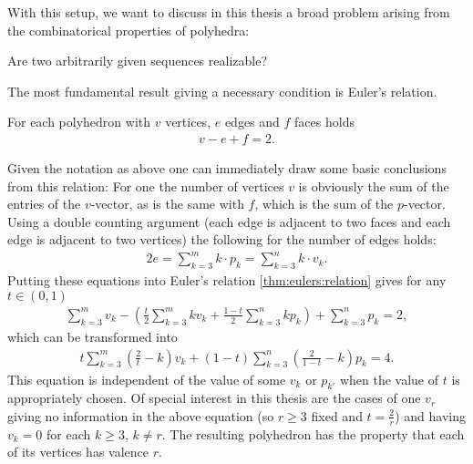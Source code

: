 With this setup, we want to discuss in this thesis a broad problem arising from the combinatorical properties of polyhedra:
\begin{problem} Are two arbitrarily given sequences realizable?
\end{problem}
The most fundamental result giving a necessary condition is Euler's relation.
\begin{theorem}\label{thm:eulers:relation}
  For each polyhedron with $v$ vertices, $e$ edges and $f$ faces holds
  \begin{align*}
    v - e + f = 2.
  \end{align*}
\end{theorem}
Given the notation as above one can immediately draw some basic conclusions from this relation: For one the number of vertices $v$ is obviously the sum of the entries of the $v$-vector, as is the same with $f$, which is the sum of the $p$-vector. Using a double counting argument (each edge is adjacent to two faces and each edge is adjacent to two vertices) the following for the number of edges holds:
\begin{align*}
  2e = \sum_{k=3}^{m} k \cdot p_k = \sum_{k=3}^{n} k \cdot v_k.
\end{align*}
Putting these equations into Euler's relation \autoref{thm:eulers:relation} gives for any $t \in (0, 1)$
\begin{align*}
  \sum_{k=3}^m v_k - \left(\frac{t}{2} \sum_{k=3}^m k v_k + \frac{1-t}{2} \sum_{k=3}^n k p_k \right) + \sum_{k=3}^n p_k = 2,
\end{align*}
which can be transformed into
\begin{align}
  t \sum_{k=3}^m \left(\frac{2}{t} - k \right) v_k + (1-t) \sum_{k=3}^n \left( \frac{2}{1-t} - k \right) p_k = 4. \label{eq:general:vp:relation}
\end{align}
This equation is independent of the value of some $v_k$ or $p_{k'}$ when the value of $t$ is appropriately chosen. Of special interest in this thesis are the cases of one $v_r$ giving no information in the above equation (so $r \geq 3$ fixed and $t = \frac{2}{r}$) and having $v_{k} = 0$ for each $k \geq 3$, $k \neq r$. The resulting polyhedron has the property that each of its vertices has valence $r$.

